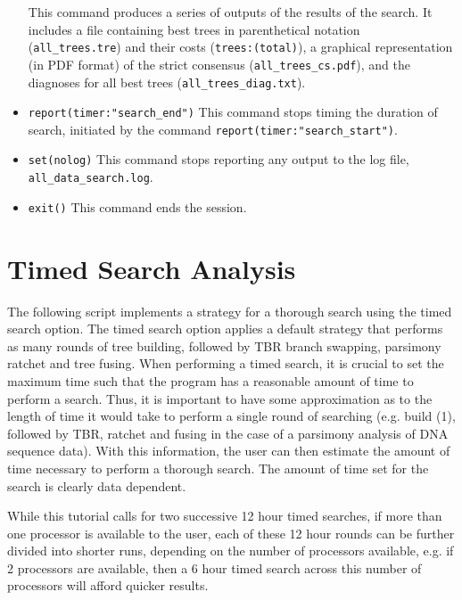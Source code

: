 \begin{itemize}
This command produces a series of outputs of the results of the search. It includes a file containing best trees in 
parenthetical notation (\texttt{all\_trees.tre}) and their costs (\texttt{trees:(total)}), a graphical representation 
(in PDF format) of the strict consensus (\texttt{all\_trees\_cs.pdf}), and the diagnoses for all best trees 
(\texttt{all\_trees\_diag.txt}).
\item \texttt{report(timer:"search\_end")} This command stops timing the duration of search, initiated by the 
command \texttt{report(timer:"search\_start")}.
\item \texttt{set(nolog)} This command stops reporting any output to the log file, \texttt{all\_data\_search.log}.
\item \texttt{exit()} This command ends the \poy session.
\end{itemize}


\section {Timed Search Analysis}{\label {tutorial2}}

The following script implements a strategy for a thorough search using the timed search option.
The timed search option applies a default strategy that performs as many rounds of tree building, 
followed by TBR branch swapping, parsimony ratchet and tree fusing. When performing a timed 
search, it is crucial to set the maximum time such that the program has a reasonable amount of 
time to perform a search.  Thus, it is important to have some approximation as to the length of 
time it would take to perform a single round of searching (e.g. build (1), followed by TBR, 
ratchet and fusing in the case of a parsimony analysis of DNA sequence data).  With this information, 
the user can then estimate the amount of time necessary to perform a thorough search. The amount 
of time set for the search is clearly data dependent. 

While this tutorial calls 
for two successive 12 hour timed searches, if more than one processor is available to the user, each 
of these 12 hour rounds can be further divided into shorter runs, depending on the number of processors
available, e.g. if 2 processors are available, then a 6 hour timed search across this number of processors
will afford quicker results.

